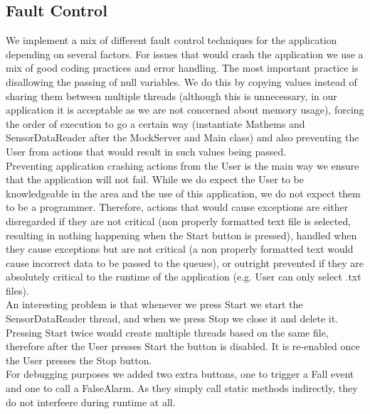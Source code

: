 \documentclass[hidelinks,conference,12pt]{IEEETran}
\begin{document}
\subsection{Fault Control}
We implement a mix of different fault control techniques for the application depending on several factors. For issues that would crash the application we use a mix of good coding practices and error handling. The most important practice is disallowing the passing of null variables. We do this by copying values instead of sharing them between multiple threads (although this is unnecessary, in our application it is acceptable as we are not concerned about memory usage), forcing the order of execution to go a certain way (instantiate Mathems and SensorDataReader after the MockServer and Main class) and also preventing the User from actions that would result in such values being passed. \\
Preventing application crashing actions from the User is the main way we ensure that the application will not fail. While we do expect the User to be knowledgeable in the area and the use of this application, we do not expect them to be a programmer. Therefore, actions that would cause exceptions are either disregarded if they are not critical (non properly formatted text file is selected, resulting in nothing happening when the Start button is pressed), handled when they cause exceptions but are not critical (a non properly formatted text would cause incorrect data to be passed to the queues), or outright prevented if they are absolutely critical to the runtime of the application (e.g. User can only select .txt files).\\
An interesting problem is that whenever we press Start we start the SensorDataReader thread, and when we press Stop we close it and delete it. Pressing Start twice would create multiple threads based on the same file, therefore after the User presses Start the button is disabled. It is re-enabled once the User presses the Stop button.\\
For debugging purposes we added two extra buttons, one to trigger a Fall event and one to call a FalseAlarm. As they simply call static methods indirectly, they do not interfeere during runtime at all.

\nocite{*}
\printbibliography
\end{document}
